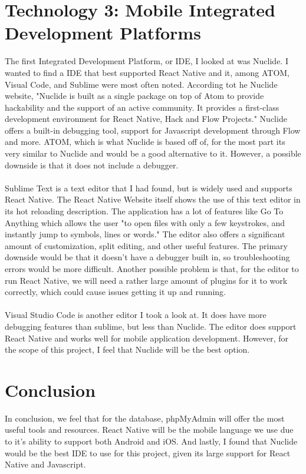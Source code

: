 \documentclass[letterpaper, 10, draftclsnofoot, onecolumn]{IEEEtran}
\begin{document}
\section*{\textbf{Technology 3: Mobile Integrated Development Platforms}}
The first Integrated Development Platform, or IDE, I looked at was Nuclide. I wanted to find a IDE that best supported React Native and it, among ATOM, Visual Code, and Sublime were most often noted. According tot he Nuclide website, "Nuclide is built as a single package on top of Atom to provide hackability and the support of an active community. It provides a first-class development environment for React Native, Hack and Flow Projects\cite{r7}." Nuclide offers a built-in debugging tool, support for Javascript development through Flow and more. ATOM, which is what Nuclide is based off of, for the most part its very similar to Nuclide and would be a good alternative to it. However, a possible downside is that it does not include a debugger.    
\\ \\
\indent Sublime Text is a text editor that I had found, but is widely used and supports React Native. The React Native Website itself shows the use of this text editor in its hot reloading description\cite{r6}. The application has a lot of features like Go To Anything which allows the user "to open files with only a few keystrokes, and instantly jump to symbols, lines or words\cite{r8}." The editor also offers a significant amount of customization, split editing, and other useful features. The primary downside would be that it doesn't have a debugger built in, so troubleshooting errors would be more difficult. Another possible problem is that, for the editor to run React Native, we will need a rather large amount of plugins for it to work correctly, which could cause issues getting it up and running. 
\\ \\
\indent Visual Studio Code is another editor I took a look at. It does have more debugging features than sublime, but less than Nuclide. The editor does support React Native and works well for mobile application development. However, for the scope of this project, I feel that Nuclide will be the best option. 

\section*{\textbf{Conclusion}} In conclusion, we feel that for the database, phpMyAdmin will offer the most useful tools and resources. React Native will be the mobile language we use due to it's ability to support both Android and iOS. And lastly, I found that Nuclide would be the best IDE to use for this project, given its large support for React Native and Javascript. 

\clearpage


\end{document}
